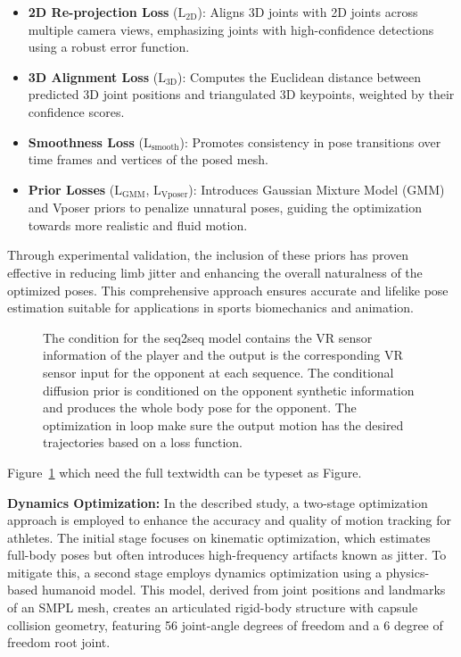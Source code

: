\begin{itemize}
    \item \textbf{2D Re-projection Loss} ($\mathrm{L}_\text{2D}$): Aligns 3D joints with 2D joints across multiple camera views, emphasizing joints with high-confidence detections using a robust error function.
    \item \textbf{3D Alignment Loss} ($\mathrm{L}_\text{3D}$): Computes the Euclidean distance between predicted 3D joint positions and triangulated 3D keypoints, weighted by their confidence scores.
    \item \textbf{Smoothness Loss} ($\mathrm{L}_\text{smooth}$): Promotes consistency in pose transitions over time frames and vertices of the posed mesh.
    \item \textbf{Prior Losses} ($\mathrm{L}_{\text{GMM}}$, $\mathrm{L}_{\text{Vposer}}$): Introduces Gaussian Mixture Model (GMM) and Vposer priors to penalize unnatural poses, guiding the optimization towards more realistic and fluid motion.
\end{itemize}

Through experimental validation, the inclusion of these priors has proven effective in reducing limb jitter and enhancing the overall naturalness of the optimized poses. This comprehensive approach ensures accurate and lifelike pose estimation suitable for applications in sports biomechanics and animation.

\begin{figure}[htbp]
  \centering

  

  \caption{\label{fig:condtion-diffusion}
           The condition for the seq2seq model contains the VR sensor information of the player and the output is the corresponding VR sensor input for the opponent at each sequence. The conditional diffusion prior is conditioned on the opponent synthetic information and produces the whole body pose for the opponent. The optimization in loop make sure the output motion has the desired trajectories based on a loss function.}
\end{figure}

Figure~\ref{fig:condtion-diffusion} which need the full textwidth can be typeset as Figure.

\textbf{Dynamics Optimization:} In the described study, a two-stage optimization approach is employed to enhance the accuracy and quality of motion tracking for athletes. The initial stage focuses on kinematic optimization, which estimates full-body poses but often introduces high-frequency artifacts known as jitter. To mitigate this, a second stage employs dynamics optimization using a physics-based humanoid model. This model, derived from joint positions and landmarks of an SMPL mesh, creates an articulated rigid-body structure with capsule collision geometry, featuring 56 joint-angle degrees of freedom and a 6 degree of freedom root joint.

